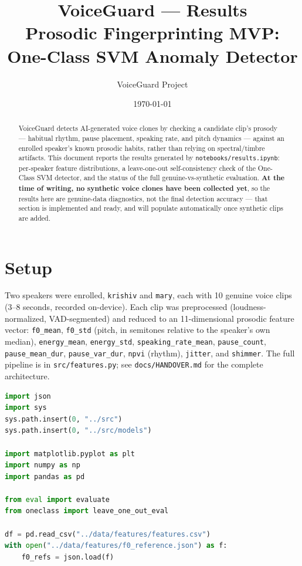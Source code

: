 \documentclass[11pt]{article}
\title{VoiceGuard — Results\\
\large Prosodic Fingerprinting MVP: One-Class SVM Anomaly Detector}
\author{VoiceGuard Project}
\date{\today}
\begin{document}
\maketitle

\begin{abstract}
\noindent
VoiceGuard detects AI-generated voice clones by checking a candidate
clip's prosody — habitual rhythm, pause placement, speaking rate, and
pitch dynamics — against an enrolled speaker's known prosodic habits,
rather than relying on spectral/timbre artifacts. This document reports
the results generated by \texttt{notebooks/results.ipynb}: per-speaker
feature distributions, a leave-one-out self-consistency check of the
One-Class SVM detector, and the status of the full genuine-vs-synthetic
evaluation. \textbf{At the time of writing, no synthetic voice clones
have been collected yet}, so the results here are genuine-data
diagnostics, not the final detection accuracy — that section is
implemented and ready, and will populate automatically once synthetic
clips are added.
\end{abstract}

\tableofcontents

\section{Setup}

Two speakers were enrolled, \texttt{krishiv} and \texttt{mary}, each
with 10 genuine voice clips (3--8 seconds, recorded on-device). Each
clip was preprocessed (loudness-normalized, VAD-segmented) and reduced
to an 11-dimensional prosodic feature vector:
\texttt{f0\_mean}, \texttt{f0\_std} (pitch, in semitones relative to
the speaker's own median), \texttt{energy\_mean}, \texttt{energy\_std},
\texttt{speaking\_rate\_mean}, \texttt{pause\_count},
\texttt{pause\_mean\_dur}, \texttt{pause\_var\_dur}, \texttt{npvi}
(rhythm), \texttt{jitter}, and \texttt{shimmer}. The full pipeline is
in \texttt{src/features.py}; see \texttt{docs/HANDOVER.md} for the
complete architecture.

\begin{lstlisting}[language=Python]
import json
import sys
sys.path.insert(0, "../src")
sys.path.insert(0, "../src/models")

import matplotlib.pyplot as plt
import numpy as np
import pandas as pd

from eval import evaluate
from oneclass import leave_one_out_eval

df = pd.read_csv("../data/features/features.csv")
with open("../data/features/f0_reference.json") as f:
    f0_refs = json.load(f)
\end{lstlisting}
\end{document}
